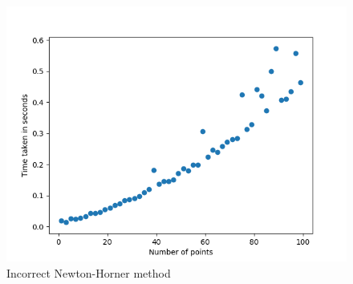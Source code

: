 \begin{figure}[ht]
  \caption{Incorrect Newton-Horner method}
  \includegraphics[width=\linewidth]{timeplot_newton}
\end{figure}

